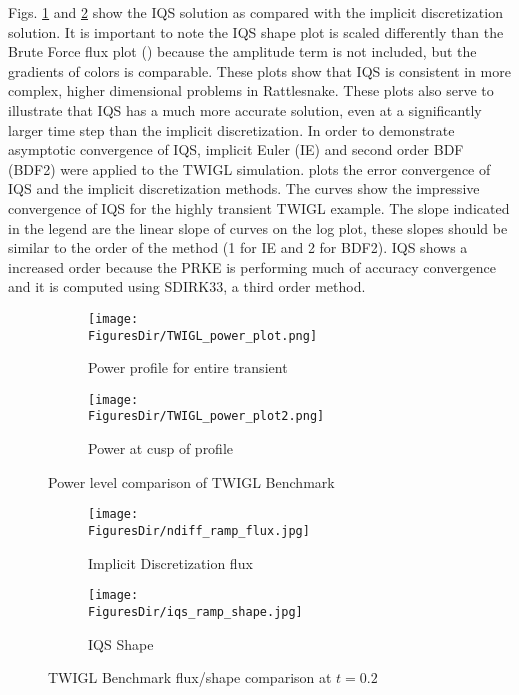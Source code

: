 Figs. \ref{fig:TWIGL_power} and \ref{fig:TWIGL_plots} show the IQS  solution as compared with the implicit discretization solution.  It is important to note the IQS shape plot is scaled differently than the Brute Force flux plot () because the amplitude term is not included, but the gradients of colors is comparable. These plots show that IQS is consistent in more complex, higher dimensional problems in Rattlesnake. These plots also serve to illustrate that IQS has a much more accurate solution, even at a significantly larger time step than the implicit discretization. In order to demonstrate asymptotic convergence of IQS, implicit Euler (IE) and second order BDF (BDF2) were applied to the TWIGL simulation.  plots the error convergence of IQS and the implicit discretization methods.  The curves show the impressive convergence of IQS for the highly transient TWIGL example. The slope indicated in the legend are the linear slope of curves on the log plot, these slopes should be similar to the order of the method (1 for IE and 2 for BDF2).  IQS shows a increased order because the PRKE is performing much of accuracy convergence and it is computed using SDIRK33, a third order method.

\begin{figure}[!htbp]
\centering
\begin{subfigure}[!htbp]{0.49\textwidth}
\texttt{[image: \\FiguresDir/TWIGL\_power\_plot.png]}
\caption{Power profile for entire transient}
\end{subfigure}
\begin{subfigure}[!htbp]{0.49\textwidth}
\texttt{[image: \\FiguresDir/TWIGL\_power\_plot2.png]}
\caption{Power at cusp of profile}
\end{subfigure}
\caption{Power level comparison of TWIGL Benchmark}
\label{fig:TWIGL_power}
\end{figure}

\begin{figure}[!htbp]
\begin{center}
\begin{subfigure}[!htbp]{0.4\textwidth}
\texttt{[image: \\FiguresDir/ndiff\_ramp\_flux.jpg]}
\caption{Implicit Discretization flux}
\end{subfigure}
\quad
\begin{subfigure}[!htbp]{0.4\textwidth}
\texttt{[image: \\FiguresDir/iqs\_ramp\_shape.jpg]}
\caption{IQS Shape}
\end{subfigure}
\caption{TWIGL Benchmark flux/shape comparison at $t=0.2$}
\label{fig:TWIGL_plots}
\end{center}
\end{figure}

